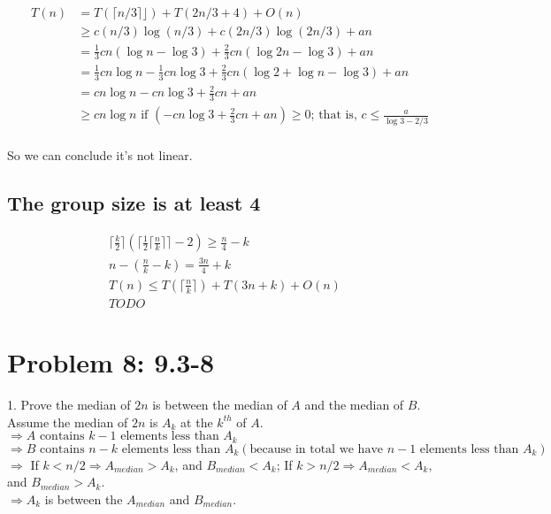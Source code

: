 \documentclass[a4paper]{article}
\begin{document}
\begin{align*}
    T(n) & = T(\lceil{n/3}\rceil⌋)+T(2n/3+4) + O(n) \\
    & \geq c(n/3)\log (n/3)+c(2n/3)\log (2n/3) + an \\
    & =\frac{1}{3}cn(\log n -\log 3)+\frac{2}{3}cn(\log 2n -\log 3) + an\\
    & =\frac{1}{3}cn\log n -\frac{1}{3}cn\log 3+\frac{2}{3}cn(\log 2 + \log n -\log 3) + an\\
    & = cn\log n -cn\log 3+\frac{2}{3}cn + an\\
    & \geq cn\log n \text{ if } (-cn\log 3+\frac{2}{3}cn + an)\geq0 \text{; that is, } c\leq \frac{a}{\log 3 - 2/3} \\
\end{align*}

So we can conclude it's not linear.

\subsection{The group size is at least 4}
\begin{align*}
 \Big\lceil{\frac{k}{2}}\Big\rceil(\bigg\lceil{\frac{1}{2}\Big\lceil{\frac{n}{k}}\Big\rceil}\bigg\rceil-2)\geq \frac{n}{4}-k&\\
 n-(\frac{n}{k}-k)=\frac{3n}{4}+k&\\
 T(n)\leq T(\lceil{\frac{n}{k}}\rceil)+T(3n+k)+O(n)\\
 TODO
\end{align*}

\section{Problem 8: 9.3-8} 
1. Prove the median of $2n$ is between the median of $A$ and the median of $B$.\\
Assume the median of $2n$ is $A_k$ at the $k^{th}$ of $A$.\\
$\Rightarrow A \text{ contains } k-1 \text{ elements less than } A_k$\\
$\Rightarrow B \text{ contains } n-k \text{ elements less than } A_k (\text{because in total we have } n-1 \text{ elements less than } A_k)$\\
$\Rightarrow$ If $k<n/2\Rightarrow A_{median}>A_k$, and $B_{median}<A_k$; If $k>n/2\Rightarrow A_{median}<A_k$, and $B_{median}>A_k$.\\
$\Rightarrow A_k$ is between the $A_{median}$ and $B_{median}$.\\
\end{document}
